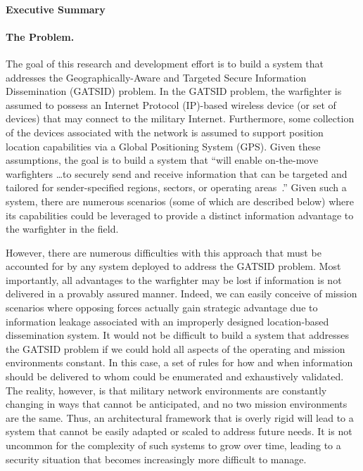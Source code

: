 \documentclass{sbir}
\begin{document}
\paragraph{Executive Summary}
\paragraph{The Problem.} The goal of this research and development effort is to build a system that addresses the Geographically-Aware and Targeted Secure Information Dissemination (GATSID) problem. In the GATSID problem, the warfighter is assumed to possess an Internet Protocol (IP)-based wireless device (or set of devices) that may connect to the military Internet. Furthermore, some collection of the devices associated with the network is assumed to support position location capabilities via a Global Positioning System (GPS). Given these assumptions, the goal is to build a system that ``will enable on-the-move warfighters \ldots to securely send and receive information that can be targeted and tailored for sender-specified regions, sectors, or operating areas~\cite{AF131-039}.'' Given such a system, there are numerous scenarios (some of which are described below) where its capabilities could be leveraged to provide a distinct information advantage to the warfighter in the field.

However, there are numerous difficulties with this approach that must be accounted for by any system deployed to address the GATSID problem. Most importantly, all advantages to the warfighter may be lost if information is not delivered in a provably assured manner. Indeed, we can easily conceive of mission scenarios where opposing forces actually gain strategic advantage due to information leakage associated with an improperly designed location-based dissemination system. It would not be difficult to build a system that addresses the GATSID problem if we could hold all aspects of the operating and mission environments constant. In this case, a set of rules for how and when information should be delivered to whom could be enumerated and exhaustively validated. The reality, however, is that military network environments are constantly changing in ways that cannot be anticipated, and no two mission environments are the same. Thus, an architectural framework that is overly rigid will lead to a system that cannot be easily adapted or scaled to address future needs. It is not uncommon for the complexity of such systems to grow over time, leading to a security situation that becomes increasingly more difficult to manage.
\end{document}
